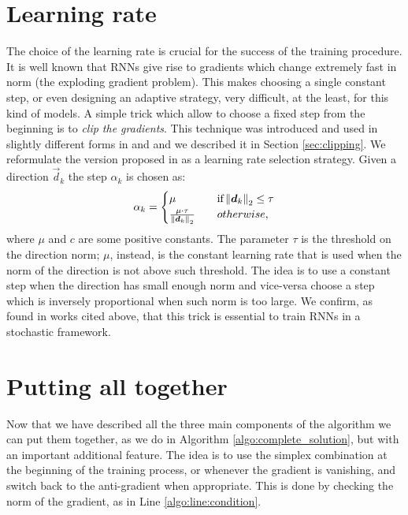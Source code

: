 \section{Learning rate}

The choice of the learning rate is crucial for the success of the training procedure. It is well known that RNNs give rise to gradients which change extremely fast in norm (the exploding gradient problem). This makes choosing a single constant step, or even designing an adaptive strategy, very difficult, at the least, for this kind of models. A simple trick which allow to choose a fixed step from the beginning is to \textit{clip the gradients}. This technique was introduced and used in slightly different forms in \cite{understandingExplodingGradients} and \cite{clippingMikolov} and we described it in Section \ref{sec:clipping}. We reformulate the version proposed in \cite{understandingExplodingGradients} as a learning rate selection strategy.
Given a direction $\vec{d}_k$ the step $\alpha_k$ is chosen as:
\begin{equation}
\alpha_k = 
\begin{cases}
	\mu  \quad &\mbox{if} \left\Vert \boldsymbol{d}_k \right\Vert_2 \leq \tau\\
	\frac{\mu \cdot \tau}{\left\Vert \boldsymbol{d}_k \right\Vert_2} \quad & otherwise,
\end{cases}
\end{equation}
where $\mu$ and $c$ are some positive constants. The parameter $\tau$ is the threshold on the direction norm; $\mu$, instead, is the constant learning rate that is used when the norm of the direction is not above such threshold. The idea is to use a constant step when the direction has small enough norm and vice-versa choose a step which is inversely proportional when such norm is too large. We confirm, as found in works cited above, that this trick is essential to train RNNs in a stochastic framework.

\section{Putting all together}
Now that we have described all the three main components of the algorithm we can put them together, as we do in Algorithm \ref{algo:complete_solution}, but with an important additional feature. The idea is to use the simplex combination at the beginning of the training process, or whenever the gradient is vanishing, and switch back to the anti-gradient when appropriate. This is done by checking the norm of the gradient, as in Line \ref{algo:line:condition}.


